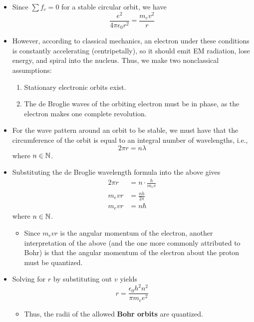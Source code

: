 \documentclass[../notes.tex]{subfiles}
\begin{document}
\begin{itemize}
\begin{itemize}
        \item Since $\sum f_c=0$ for a stable circular orbit, we have
        \begin{equation*}
            \frac{e^2}{4\pi\epsilon_0r^2} = \frac{m_ev^2}{r}
        \end{equation*}
        \item However, according to classical mechanics, an electron under these conditions is constantly accelerating (centripetally), so it should emit EM radiation, lose energy, and spiral into the nucleus. Thus, we make two nonclassical assumptions:
        \begin{enumerate}
            \item Stationary electronic orbits exist.
            \item The de Broglie waves of the orbiting electron must be in phase, as the electron makes one complete revolution.
        \end{enumerate}
        \item For the wave pattern around an orbit to be stable, we must have that the circumference of the orbit is equal to an integral number of wavelengths, i.e.,
        \begin{equation*}
            2\pi r = n\lambda
        \end{equation*}
        where $n\in\mathbb{N}$.
        \item Substituting the de Broglie wavelength formula into the above gives
        \begin{align*}
            2\pi r &= n\cdot\frac{h}{m_ev}\\
            m_evr &= \frac{nh}{2\pi}\\
            m_evr &= n\hbar
        \end{align*}
        where $n\in\mathbb{N}$.
        \begin{itemize}
            \item Since $m_evr$ is the angular momentum of the electron, another interpretation of the above (and the one more commonly attributed to Bohr) is that the angular momentum of the electron about the proton must be quantized.
        \end{itemize}
        \item Solving for $r$ by substituting out $v$ yields
        \begin{equation*}
            r = \frac{\epsilon_0h^2n^2}{\pi m_ee^2}
        \end{equation*}
        \begin{itemize}
            \item Thus, the radii of the allowed \textbf{Bohr orbits} are quantized.

\end{itemize}
\end{itemize}
\end{itemize}
\end{document}
